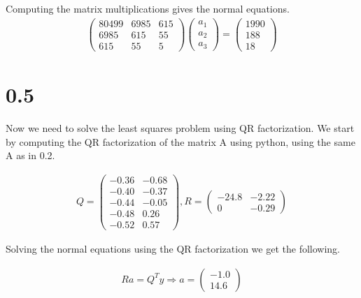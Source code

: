 \documentclass[a4paper]{article}
\begin{document}
Computing the matrix multiplications gives the normal equations.
\begin{align*}
    \begin{pmatrix}
        80499 & 6985 & 615 \\
        6985 & 615 & 55\\
        615 & 55 & 5
    \end{pmatrix} \begin{pmatrix}
        a_1 \\ a_2 \\ a_3
    \end{pmatrix} = \begin{pmatrix}
        1990\\188\\18
    \end{pmatrix}
\end{align*}

\section*{0.5}

Now we need to solve the least squares problem using QR factorization. We start by computing the QR factorization of the matrix A using python, using the same A as in 0.2.

\begin{align*}
    Q = \begin{pmatrix}
        -0.36 & -0.68 \\
        -0.40 & -0.37 \\
        -0.44 & -0.05 \\
        -0.48 & 0.26 \\
        -0.52 & 0.57
    \end{pmatrix}, R = \begin{pmatrix}
        -24.8 & -2.22 \\
        0 & -0.29
    \end{pmatrix}
\end{align*}

Solving the normal equations using the QR factorization we get the following.

\begin{align*}
    Ra = Q^Ty \Rightarrow a = \begin{pmatrix}
        -1.0\\
        14.6
    \end{pmatrix}\\
\end{align*}
\end{document}
